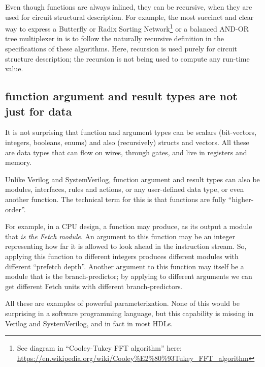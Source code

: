 
Even though {\BSV} functions are always inlined, they can be
recursive, when they are used for circuit structural description.  For
example, the most succinct and clear way to express a Butterfly or
Radix Sorting Network\footnote{See diagram in ``Cooley-Tukey FFT
algorithm'' here:
\url{https://en.wikipedia.org/wiki/Cooley\%E2\%80\%93Tukey_FFT_algorithm}}
or a balanced AND-OR tree multiplexer in {\BSV} is to follow the
naturally recursive definition in the specifications of these
algorithms.  Here, recursion is used purely for circuit structure
description; the recursion is not being used to compute any run-time
value.


\subsection{{\BSV} function argument and result types are not just for data}


It is not surprising that {\BSV} function and argument types can be
scalars (bit-vectors, integers, booleans, enums) and also
(recursively) structs and vectors.  All these are data types that can
flow on wires, through gates, and live in registers and memory.

Unlike Verilog and SystemVerilog, {\BSV} function argument and result
types can also be modules, interfaces, rules and actions, or any
user-defined data type, or even another function.  The technical term
for this is that {\BSV} functions are fully ``higher-order''.

For example, in a CPU design, a {\BSV} function may produce, as its
output a module that \emph{is the Fetch module}.  An argument to this
function may be an integer representing how far it is allowed to look
ahead in the instruction stream.  So, applying this function to
different integers produces different modules with different
``prefetch depth''.  Another argument to this function may itself be a
module that is the branch-predictor; by applying to different
arguments we can get different Fetch units with different
branch-predictors.

All these are examples of powerful parameterization.  None of this
would be surprising in a software programming language, but this
capability is missing in Verilog and SystemVerilog, and in fact in
most HDLs.

